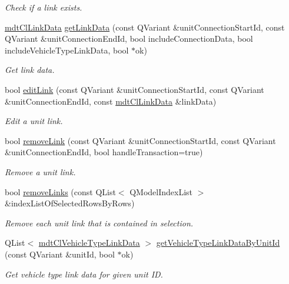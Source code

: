 \begin{DoxyCompactItemize}
\begin{DoxyCompactList}\small\item\em Check if a link exists. \end{DoxyCompactList}\item 
\hyperlink{classmdt_cl_link_data}{mdt\-Cl\-Link\-Data} \hyperlink{classmdt_cl_link_ab84d16e3db0b15784594505e9996c0dc}{get\-Link\-Data} (const Q\-Variant \&unit\-Connection\-Start\-Id, const Q\-Variant \&unit\-Connection\-End\-Id, bool include\-Connection\-Data, bool include\-Vehicle\-Type\-Link\-Data, bool $\ast$ok)
\begin{DoxyCompactList}\small\item\em Get link data. \end{DoxyCompactList}\item 
bool \hyperlink{classmdt_cl_link_a20d0c8888a1674a6977940fcde654f60}{edit\-Link} (const Q\-Variant \&unit\-Connection\-Start\-Id, const Q\-Variant \&unit\-Connection\-End\-Id, const \hyperlink{classmdt_cl_link_data}{mdt\-Cl\-Link\-Data} \&link\-Data)
\begin{DoxyCompactList}\small\item\em Edit a unit link. \end{DoxyCompactList}\item 
bool \hyperlink{classmdt_cl_link_a865c0cee1fab1c9209d139dcd70f9fbd}{remove\-Link} (const Q\-Variant \&unit\-Connection\-Start\-Id, const Q\-Variant \&unit\-Connection\-End\-Id, bool handle\-Transaction=true)
\begin{DoxyCompactList}\small\item\em Remove a unit link. \end{DoxyCompactList}\item 
bool \hyperlink{classmdt_cl_link_ad89403d68ce0b31f0c8c21ad278e0f83}{remove\-Links} (const Q\-List$<$ Q\-Model\-Index\-List $>$ \&index\-List\-Of\-Selected\-Rows\-By\-Rows)
\begin{DoxyCompactList}\small\item\em Remove each unit link that is contained in selection. \end{DoxyCompactList}\item 
Q\-List$<$ \hyperlink{classmdt_cl_vehicle_type_link_data}{mdt\-Cl\-Vehicle\-Type\-Link\-Data} $>$ \hyperlink{classmdt_cl_link_ad7c30c7cfae5f38fc38133f550e2dd01}{get\-Vehicle\-Type\-Link\-Data\-By\-Unit\-Id} (const Q\-Variant \&unit\-Id, bool $\ast$ok)
\begin{DoxyCompactList}\small\item\em Get vehicle type link data for given unit I\-D. \end{DoxyCompactList}\item 

\end{DoxyCompactItemize}

